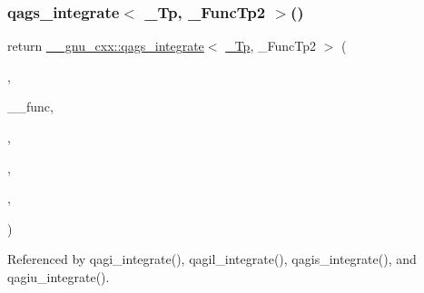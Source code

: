 \subsubsection{\texorpdfstring{qags\+\_\+integrate$<$ \+\_\+\+Tp, \+\_\+\+Func\+Tp2 $>$()}{qags\_integrate< \_Tp, \_FuncTp2 >()}\hspace{0.1cm}{\footnotesize\ttfamily [1/4]}}
{\footnotesize\ttfamily return \hyperlink{namespace____gnu__cxx_afde6c192a4e11d49f4c9c117277980ff}{\+\_\+\+\_\+gnu\+\_\+cxx\+::qags\+\_\+integrate}$<$ \hyperlink{namespace____gnu__cxx_a3b19a9c800ca194374ef9172290f7d79}{\+\_\+\+Tp}, \+\_\+\+Func\+Tp2 $>$ (\begin{DoxyParamCaption}\item[{\+\_\+\+\_\+workspace}]{,  }\item[{\hyperlink{struct____gnu__cxx_1_1map__minf__pinf}{map\+\_\+minf\+\_\+pinf}$<$ \hyperlink{namespace____gnu__cxx_a3b19a9c800ca194374ef9172290f7d79}{\+\_\+\+Tp}, \+\_\+\+Func\+Tp $>$}]{\+\_\+\+\_\+func,  }\item[{\hyperlink{namespace____gnu__cxx_a3b19a9c800ca194374ef9172290f7d79}{\+\_\+\+Tp}\{0\}}]{,  }\item[{\hyperlink{namespace____gnu__cxx_a3b19a9c800ca194374ef9172290f7d79}{\+\_\+\+Tp}\{1\}}]{,  }\item[{\+\_\+\+\_\+max\+\_\+abs\+\_\+err}]{,  }\item[{\+\_\+\+\_\+max\+\_\+rel\+\_\+err}]{ }\end{DoxyParamCaption})}



Referenced by qagi\+\_\+integrate(), qagil\+\_\+integrate(), qagis\+\_\+integrate(), and qagiu\+\_\+integrate().

\mbox{\label{namespace____gnu__cxx_a454f1c38cacdbcfa8076d60f86a5f57d}} 
